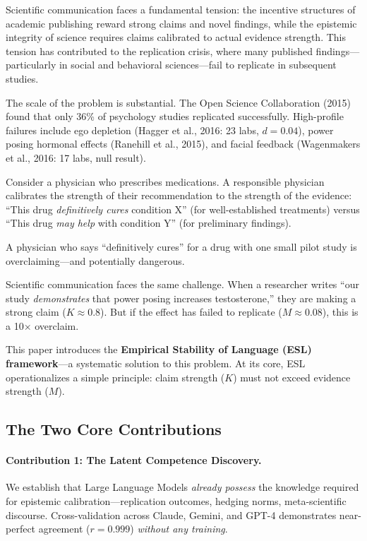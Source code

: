 \documentclass[11pt,a4paper]{article}
\begin{document}
Scientific communication faces a fundamental tension: the incentive structures of academic publishing reward strong claims and novel findings, while the epistemic integrity of science requires claims calibrated to actual evidence strength. This tension has contributed to the replication crisis, where many published findings---particularly in social and behavioral sciences---fail to replicate in subsequent studies.

The scale of the problem is substantial. The Open Science Collaboration (2015) found that only 36\% of psychology studies replicated successfully. High-profile failures include ego depletion (Hagger et al., 2016: 23 labs, $d = 0.04$), power posing hormonal effects (Ranehill et al., 2015), and facial feedback (Wagenmakers et al., 2016: 17 labs, null result).

\begin{analogybox}
Consider a physician who prescribes medications. A responsible physician calibrates the strength of their recommendation to the strength of the evidence: ``This drug \emph{definitively cures} condition X'' (for well-established treatments) versus ``This drug \emph{may help} with condition Y'' (for preliminary findings).

A physician who says ``definitively cures'' for a drug with one small pilot study is overclaiming---and potentially dangerous.

Scientific communication faces the same challenge. When a researcher writes ``our study \emph{demonstrates} that power posing increases testosterone,'' they are making a strong claim ($K \approx 0.8$). But if the effect has failed to replicate ($M \approx 0.08$), this is a 10$\times$ overclaim.
\end{analogybox}

This paper introduces the \textbf{Empirical Stability of Language (ESL) framework}---a systematic solution to this problem. At its core, ESL operationalizes a simple principle: claim strength ($K$) must not exceed evidence strength ($M$).


\subsection{The Two Core Contributions}

\paragraph{Contribution 1: The Latent Competence Discovery.} We establish that Large Language Models \emph{already possess} the knowledge required for epistemic calibration---replication outcomes, hedging norms, meta-scientific discourse. Cross-validation across Claude, Gemini, and GPT-4 demonstrates near-perfect agreement ($r = 0.999$) \emph{without any training}.
\end{document}
